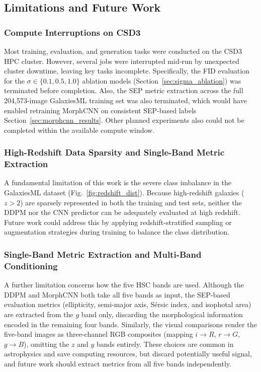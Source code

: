 \documentclass[fleqn,usenatbib]{mnras}
\begin{document}
\subsection{Limitations and Future Work}

\subsubsection{Compute Interruptions on CSD3}

Most training, evaluation, and generation tasks were conducted on
the CSD3 HPC cluster.
However, several jobs were interrupted mid-run by unexpected cluster
downtime, leaving key tasks incomplete.
Specifically, the FID evaluation for the $\sigma \in \{0.1, 0.5, 1.0\}$
ablation models (Section~\ref{sec:sigma_ablation}) was terminated
before completion. Also, the SEP metric extraction across the full
204,573-image GalaxiesML training set was also terminated, which would have enabled
retraining MorphCNN on consistent SEP-based labels
Section~\ref{sec:morphcnn_results}.
Other planned experiments also could not be completed within the available compute window.



\subsubsection{High-Redshift Data Sparsity and Single-Band Metric Extraction}

A fundamental limitation of this work is the severe class imbalance in the
GalaxiesML dataset (Fig.~\ref{fig:redshift_dist}).
Because high-redshift galaxies ($z > 2$) are sparsely represented
in both the training and test sets, neither the DDPM nor the CNN
predictor can be adequately evaluated at high redshift.
Future work could address this by applying redshift-stratified
sampling or augmentation strategies during training to balance
the class distribution.

\subsubsection{Single-Band Metric Extraction and Multi-Band Conditioning}

A further limitation concerns how the five HSC bands are used.
Although the DDPM and MorphCNN both take all five bands as input,
the SEP-based evaluation metrics (ellipticity, semi-major axis,
S\'{e}rsic index, and isophotal area) are extracted from the $g$
band only, discarding the morphological information encoded in the
remaining four bands.
Similarly, the visual comparisons render the five-band images as
three-channel RGB composites (mapping $i \to R$, $r \to G$,
$g \to B$), omitting the $z$ and $y$ bands entirely.
These choices are common in astrophysics and save computing resources, but discard potentially useful signal,
and future work should extract metrics from all five bands
independently.
\end{document}
